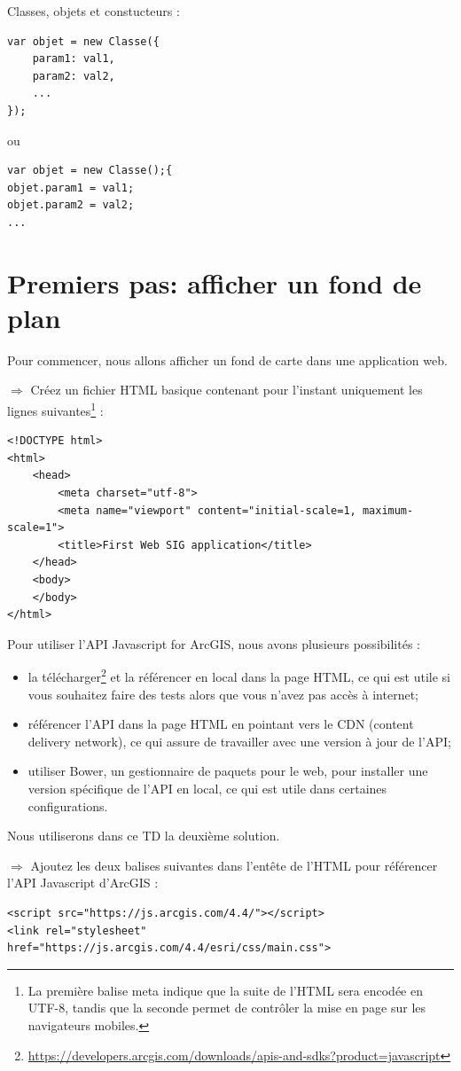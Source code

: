 \documentclass[11pt]{article}
\newcommand{\action}{$\Rightarrow$ }
\begin{document}
Classes, objets et constucteurs :
\begin{lstlisting}
var objet = new Classe({
	param1: val1,
	param2: val2,
	...
});
\end{lstlisting}
ou
\begin{lstlisting}
var objet = new Classe();{
objet.param1 = val1;
objet.param2 = val2;
...
\end{lstlisting}

\newpage



\section{Premiers pas: afficher un fond de plan}
Pour commencer, nous allons afficher un fond de carte dans une application web.

\action Créez un fichier HTML basique contenant pour l'instant uniquement les lignes suivantes\footnote{La première balise meta indique que la suite de l'HTML sera encodée en UTF-8, tandis que la seconde permet de contrôler la mise en page sur les navigateurs mobiles.} :
\begin{lstlisting}
<!DOCTYPE html>
<html>
	<head>
		<meta charset="utf-8">
		<meta name="viewport" content="initial-scale=1, maximum-scale=1">
		<title>First Web SIG application</title>
	</head>
	<body>
	</body>
</html>
\end{lstlisting}

Pour utiliser l'API Javascript for ArcGIS, nous avons plusieurs possibilités :
\begin{itemize}
	\item la télécharger\footnote{\url{https://developers.arcgis.com/downloads/apis-and-sdks?product=javascript}} et la référencer en local dans la page HTML, ce qui est utile si vous souhaitez faire des tests alors que vous n'avez pas accès à internet;
	\item référencer l'API dans la page HTML en pointant vers le CDN (content delivery network), ce qui assure de travailler avec une version à jour de l'API;
	\item utiliser Bower, un gestionnaire de paquets pour le web, pour installer une version spécifique de l'API en local, ce qui est utile dans certaines configurations.
\end{itemize}

Nous utiliserons dans ce TD la deuxième solution.

\action Ajoutez les deux balises suivantes dans l'entête de l'HTML pour référencer l'API Javascript d'ArcGIS :
\begin{lstlisting}
<script src="https://js.arcgis.com/4.4/"></script>
<link rel="stylesheet" href="https://js.arcgis.com/4.4/esri/css/main.css">
\end{lstlisting}
\end{document}
